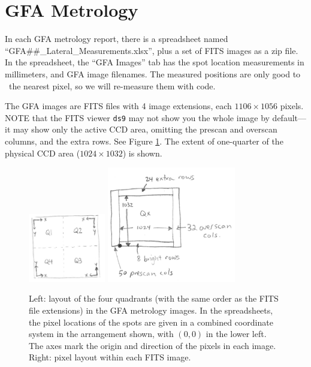 \documentclass[10pt]{article}
\newcommand{\code}[1]{\texttt{#1}}
\begin{document}
\section{GFA Metrology}

In each GFA metrology report, there is a spreadsheet named
``GFA\#\#\_Lateral\_Measurements.xlsx'', plus a set of FITS images as a
zip file.  In the spreadsheet, the ``GFA Images'' tab has the spot
location measurements in millimeters, and GFA image filenames.  The
measured positions are only good to ~the nearest pixel, so we will
re-measure them with code.

The GFA images are FITS files with 4 image extensions, each $1106
\times 1056$ pixels.  NOTE that the FITS viewer \code{ds9} may not
show you the whole image by default---it may show only the active CCD
area, omitting the prescan and overscan columns, and the extra rows.
See Figure \ref{fig:metrologya}.  The extent of one-quarter of
the physical CCD area ($1024 \times 1032$) is shown.

\begin{figure}[h!]
  \begin{center}
    \includegraphics[width=0.3\textwidth]{gfa-metrology1a.jpeg}
    \includegraphics[width=0.5\textwidth]{gfa-metrology1b.jpeg}
  \end{center}
  \caption{\label{fig:metrologya}Left: layout of the four quadrants
    (with the same order as the FITS file extensions) in the GFA
    metrology images.  In the spreadsheets, the pixel locations of the
    spots are given in a combined coordinate system in the arrangement
    shown, with $(0,0)$ in the lower left. The axes mark the origin
    and direction of the pixels in each image.  Right: pixel layout
    within each FITS image.}
\end{figure}
\end{document}
